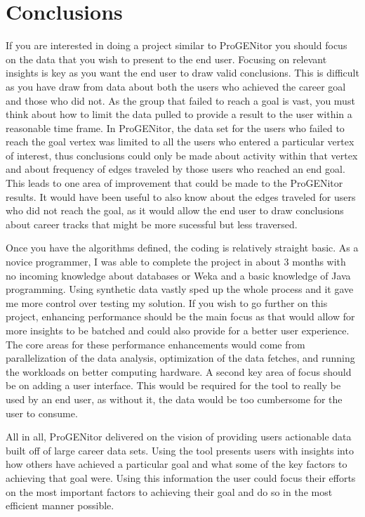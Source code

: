 \section{Conclusions}
\label{sect:conclusions}
If you are interested in doing a project similar to ProGENitor you should focus
on the data that you wish to present to the end user.  Focusing on relevant
insights is key as you want the end user to draw valid conclusions.  This is
difficult as you have draw from data about both the users who achieved the
career goal and those who did not.  As the group that failed to reach a goal is
vast, you must think about how to limit the data pulled to provide a result to
the user within a reasonable time frame.  In ProGENitor, the data set for the
users who failed to reach the goal vertex was limited to all the users who entered
a particular vertex of interest, thus conclusions could only be made about
activity within that vertex and about frequency of edges traveled by those users
who reached an end goal.  This leads to one area of improvement that could be
made to the ProGENitor results.  It would have been useful to also know about
the edges traveled for users who did not reach the goal, as it would allow the
end user to draw conclusions about career tracks that might be more sucessful
but less traversed.

Once you have the algorithms defined, the coding is relatively straight
basic.  As a novice programmer, I was able to complete the project in about 3
months with no incoming knowledge about databases or Weka and a basic knowledge
of Java programming.  Using synthetic data vastly sped up the whole process and
it gave me more control over testing my solution.  If you wish to go further on
this project, enhancing performance should be the main focus as that would allow
for more insights to be batched and could also provide for a better user
experience.  The core areas for these performance enhancements would come from
parallelization of the data analysis, optimization of the data fetches, and
running the workloads on better computing hardware.  A second key area of focus
should be on adding a user interface.  This would be required for the tool to
really be used by an end user, as without it, the data would be too cumbersome
for the user to consume.

All in all, ProGENitor delivered on the vision of providing users actionable
data built off of large career data sets.  Using the tool presents users with
insights into how others have achieved a particular goal and what some of the
key factors to achieving that goal were.  Using this information the user could
focus their efforts on the most important factors to achieving their goal and do
so in the most efficient manner possible.
